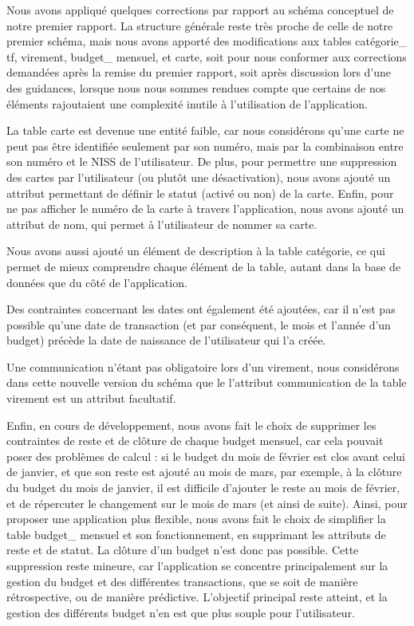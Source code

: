 \documentclass[a4paper,12pt]{article}
\begin{document}
Nous avons appliqué quelques corrections par rapport au schéma conceptuel de notre premier rapport. La structure générale reste très proche de celle de notre premier schéma, mais nous avons apporté des modifications aux tables catégorie\_ tf, virement, budget\_ mensuel, et carte, soit pour nous conformer aux corrections demandées après la remise du premier rapport, soit après discussion lors d'une des guidances, lorsque nous nous sommes rendues compte que certains de nos éléments rajoutaient une complexité inutile à l'utilisation de l'application.

La table carte est devenue une entité faible, car nous considérons qu'une carte ne peut pas être identifiée seulement par son numéro, mais par la combinaison entre son numéro et le NISS de l'utilisateur. De plus, pour permettre une \og suppression \fg des cartes par l'utilisateur (ou plutôt une désactivation), nous avons ajouté un attribut permettant de définir le statut (activé ou non) de la carte. Enfin, pour ne pas afficher le numéro de la carte à travers l'application, nous avons ajouté un attribut de nom, qui permet à l'utilisateur de nommer sa carte. 

Nous avons aussi ajouté un élément de description à la table catégorie, ce qui permet de mieux comprendre chaque élément de la table, autant dans la base de données que du côté de l'application.

Des contraintes concernant les dates ont également été ajoutées, car il n'est pas possible qu'une date de transaction (et par conséquent, le mois et l'année d'un budget) précède la date de naissance de l'utilisateur qui l'a créée.

Une communication n'étant pas obligatoire lors d'un virement, nous considérons dans cette nouvelle version du schéma que le l'attribut communication de la table virement est un attribut facultatif.

Enfin, en cours de développement, nous avons fait le choix de supprimer les contraintes de reste et de clôture de chaque budget mensuel, car cela pouvait poser des problèmes de calcul : si le budget du mois de février est clos avant celui de janvier, et que son reste est ajouté au mois de mars, par exemple, à la clôture du budget du mois de janvier, il est difficile d'ajouter le reste au mois de février, et de répercuter le changement sur le mois de mars (et ainsi de suite).
Ainsi, pour proposer une application plus flexible, nous avons fait le choix de simplifier la table budget\_ mensuel et son fonctionnement, en supprimant les attributs de reste et de statut.
La clôture d'un budget n'est donc pas possible.
Cette suppression reste mineure, car l'application se concentre principalement sur la gestion du budget et des différentes transactions, que se soit de manière rétrospective, ou de manière prédictive. L'objectif principal reste atteint, et la gestion des différents budget n'en est que plus souple pour l'utilisateur.\\
\end{document}
